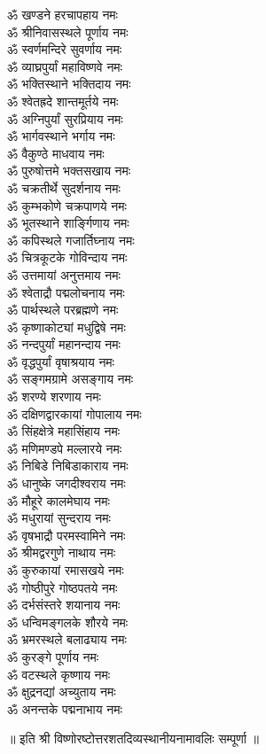 \begin{multicols}{2}
\begin{flushleft}
ॐ खण्डने हरचापहाय नमः\\
ॐ श्रीनिवासस्थले पूर्णाय नमः\\
ॐ स्वर्णमन्दिरे सुवर्णाय नमः\\
ॐ व्याघ्रपुर्यां महाविष्णवे नमः\\
ॐ भक्तिस्थाने भक्तिदाय नमः\\
ॐ श्वेतह्रदे शान्तमूर्तये नमः\\
ॐ अग्निपुर्यां सुरप्रियाय नमः\\
ॐ भार्गवस्थाने भर्गाय नमः\\
ॐ वैकुण्ठे माधवाय नमः\hfill{}\\
ॐ पुरुषोत्तमे भक्तसखाय नमः\\
ॐ चक्रतीर्थे सुदर्शनाय नमः\\
ॐ कुम्भकोणे चक्रपाणये नमः\\
ॐ भूतस्थाने शार्ङ्गिणाय नमः\\
ॐ कपिस्थले गजार्तिघ्नाय नमः\\
ॐ चित्रकूटके गोविन्दाय नमः\\
ॐ उत्तमायां अनुत्तमाय नमः\\
ॐ श्वेताद्रौ पद्मलोचनाय नमः\\
ॐ पार्थस्थले परब्रह्मणे नमः\\
ॐ कृष्णाकोट्यां मधुद्विषे नमः\hfill{}\\
ॐ नन्दपुर्यां महानन्दाय नमः\\
ॐ वृद्धपुर्यां वृषाश्रयाय नमः\\
ॐ सङ्गमग्रामे असङ्गाय नमः\\
ॐ शरण्ये शरणाय नमः\\
ॐ दक्षिणद्वारकायां गोपालाय नमः\\
ॐ सिंहक्षेत्रे महासिंहाय नमः\\
ॐ मणिमण्डपे मल्लारये नमः\\
ॐ निबिडे निबिडाकाराय नमः\\
ॐ धानुष्के जगदीश्वराय नमः\\
ॐ मौहूरे कालमेघाय नमः\hfill{}\\
ॐ मधुरायां सुन्दराय नमः\\
ॐ वृषभाद्रौ परमस्वामिने नमः\\
ॐ श्रीमद्वरगुणे नाथाय नमः\\
ॐ कुरुकायां रमासखये नमः\\
ॐ गोष्ठीपुरे गोष्ठपतये नमः\\
ॐ दर्भसंस्तरे शयानाय नमः\\
ॐ धन्विमङ्गलके शौरये नमः\\
ॐ भ्रमरस्थले बलाढ्याय नमः\\
ॐ कुरङ्गे पूर्णाय नमः\\
ॐ वटस्थले कृष्णाय नमः\hfill{}\\
ॐ क्षुद्रनद्यां अच्युताय नमः\\
ॐ अनन्तके पद्मनाभाय नमः\\
\end{flushleft}
\end{multicols}
\centerline{॥ इति श्री विष्णोरष्टोत्तरशतदिव्यस्थानीयनामावलिः सम्पूर्णा ॥}
